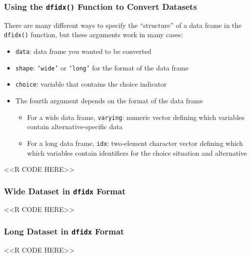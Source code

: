 \documentclass{beamer}
\begin{document}
\begin{frame}[fragile]\frametitle{Using the \texttt{dfidx()} Function to Convert Datasets}
    There are many different ways to specify the ``structure'' of a data frame in the \texttt{dfidx()} function, but these arguments work in many cases:
    \begin{itemize}
        \item \texttt{data}: data frame you wanted to be converted
        \item \texttt{shape}: \texttt{`wide'} or \texttt{`long'} for the format of the data frame
        \item \texttt{choice}: variable that contains the choice indicator
        \item The fourth argument depends on the format of the data frame
        \begin{itemize}
            \item For a wide data frame, \texttt{varying}: numeric vector defining which variables contain alternative-specific data
            \item For a long data frame, \texttt{idx}: two-element character vector defining which which variables contain identifiers for the choice situation and alternative
        \end{itemize}
    \end{itemize}
    <<R CODE HERE>>
\end{frame}

\begin{frame}[fragile]\frametitle{Wide Dataset in \texttt{dfidx} Format}
    <<R CODE HERE>>
\end{frame}

\begin{frame}[fragile]\frametitle{Long Dataset in \texttt{dfidx} Format}
    <<R CODE HERE>>
\end{frame}
\end{document}
